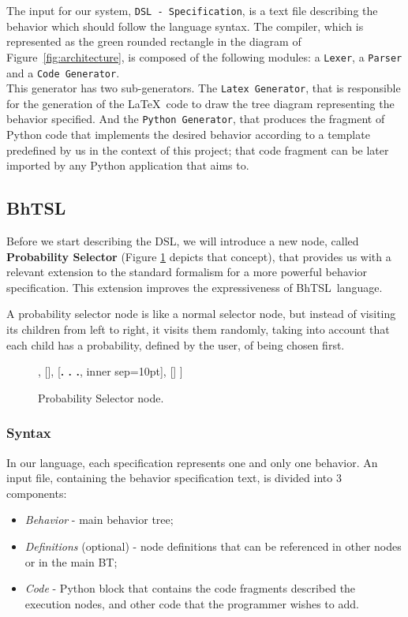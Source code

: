 \documentclass[a4paper,UKenglish,cleveref, autoref, thm-restate]{oasics-v2019}
\def\bht{BhTSL}
\begin{document}
The input for our system, \texttt{DSL - Specification}, is a text file describing the behavior which 
should follow the language syntax.
The compiler, which is represented as the green rounded rectangle in the diagram of Figure~\ref{fig:architecture}, 
is composed of the following modules: a \texttt{Lexer}, a \texttt{Parser} and a \texttt{Code Generator}.\\
This generator has two sub-generators.
The \texttt{Latex Generator}, that is responsible for the generation of the \LaTeX\ code to draw
the tree diagram representing the behavior specified.
And the \texttt{Python Generator}, that produces the fragment of Python code that implements
the desired  behavior according to a template predefined by us in the context of this project;
that code fragment can be later imported by  any Python application that aims to.

\subsection{\bht}

Before we start describing the DSL, we will introduce a new node, called \textbf{Probability Selector} 
(Figure \ref{fig:prob_selector} depicts that concept), that  provides us with a relevant extension to the standard
formalism for a more powerful  behavior specification.
This extension improves the expressiveness of \bht\ language.

A probability selector node is like a normal selector node, but instead of visiting its children from left to right, 
it visits them randomly, taking into account that each child has a probability, defined by the user, 
of being chosen first.

\begin{figure}[H]
    \centering
    \begin{behavior}
        [\probselector
            [\probnodeaction{$P_1$}{Child 1}],
            [],
            [{\textbf{. . .}}, inner sep=10pt],
            []
        ]
    \end{behavior}
    \caption{Probability Selector node.}
    \label{fig:prob_selector}
\end{figure}


\subsubsection{Syntax}
In our language, each specification represents one and only one behavior.
An  input file, containing the behavior specification text, is divided into 3 components:
\begin{itemize}
    \item \textit{Behavior} - main behavior tree;
    \item \textit{Definitions} (optional) - node definitions that can be referenced in other nodes or in the main BT;
    \item \textit{Code} - Python block that contains the code fragments described the execution nodes, and other code that the programmer wishes to add.
\end{itemize}
\end{document}
